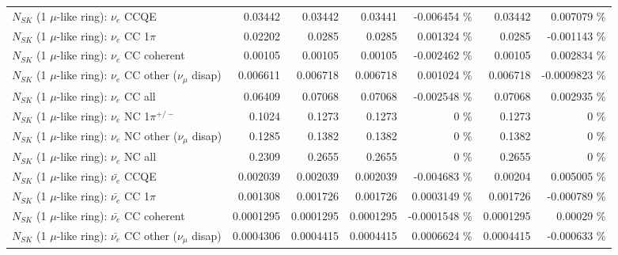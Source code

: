 \begin{table}
\begin{tabular}{| l | r | r | r  r | r  r |}
\hline
\hline
\hline
                                      $N_{SK}$ (1 $\mu$-like ring): $\nu_e$ CCQE &         0.03442 &         0.03442 &         0.03441 & -0.006454 \%  &         0.03442 & 0.007079 \%  \\ 
                                 $N_{SK}$ (1 $\mu$-like ring): $\nu_e$ CC 1$\pi$ &         0.02202 &          0.0285 &          0.0285 & 0.001324 \%  &          0.0285 & -0.001143 \%  \\ 
                               $N_{SK}$ (1 $\mu$-like ring): $\nu_e$ CC coherent &         0.00105 &         0.00105 &         0.00105 & -0.002462 \%  &         0.00105 & 0.002834 \%  \\ 
                $N_{SK}$ (1 $\mu$-like ring): $\nu_e$ CC other ($\nu_\mu$ disap) &        0.006611 &        0.006718 &        0.006718 & 0.001024 \%  &        0.006718 & -0.0009823 \%  \\ 
                                  $N_{SK}$ (1 $\mu$-like ring): $\nu_{e}$ CC all &         0.06409 &         0.07068 &         0.07068 & -0.002548 \%  &         0.07068 & 0.002935 \%  \\ 
\hline
                           $N_{SK}$ (1 $\mu$-like ring): $\nu_e$ NC 1$\pi^{+/-}$ &          0.1024 &          0.1273 &          0.1273 &        0 \%  &          0.1273 &        0 \%  \\ 
                $N_{SK}$ (1 $\mu$-like ring): $\nu_e$ NC other ($\nu_\mu$ disap) &          0.1285 &          0.1382 &          0.1382 &        0 \%  &          0.1382 &        0 \%  \\ 
                                  $N_{SK}$ (1 $\mu$-like ring): $\nu_{e}$ NC all &          0.2309 &          0.2655 &          0.2655 &        0 \%  &          0.2655 &        0 \%  \\ 
\hline
\hline
\hline
                                $N_{SK}$ (1 $\mu$-like ring): $\bar{\nu_e}$ CCQE &        0.002039 &        0.002039 &        0.002039 & -0.004683 \%  &         0.00204 & 0.005005 \%  \\ 
                           $N_{SK}$ (1 $\mu$-like ring): $\bar{\nu_e}$ CC 1$\pi$ &        0.001308 &        0.001726 &        0.001726 & 0.0003149 \%  &        0.001726 & -0.000789 \%  \\ 
                         $N_{SK}$ (1 $\mu$-like ring): $\bar{\nu_e}$ CC coherent &       0.0001295 &       0.0001295 &       0.0001295 & -0.0001548 \%  &       0.0001295 &  0.00029 \%  \\ 
          $N_{SK}$ (1 $\mu$-like ring): $\bar{\nu_e}$ CC other ($\nu_\mu$ disap) &       0.0004306 &       0.0004415 &       0.0004415 & 0.0006624 \%  &       0.0004415 & -0.000633 \%  \\ 

\end{tabular}
\end{table}
